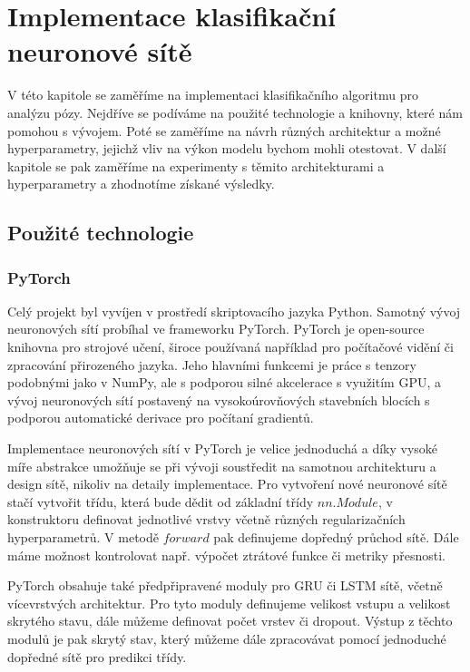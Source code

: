 \chapter{Implementace klasifikační neuronové sítě}
\label{chap:ClassificationImplementation}

V této kapitole se zaměříme na implementaci klasifikačního algoritmu pro
analýzu pózy. Nejdříve se podíváme na použité technologie a knihovny, které nám
pomohou s vývojem. Poté se zaměříme na návrh různých architektur a možné
hyperparametry, jejichž vliv na výkon modelu bychom mohli otestovat. V další
kapitole se pak zaměříme na experimenty s těmito architekturami a
hyperparametry a zhodnotíme získané výsledky.

\section{Použité technologie}

\subsection{PyTorch}

Celý projekt byl vyvíjen v prostředí skriptovacího jazyka Python. Samotný vývoj
neuronových sítí probíhal ve frameworku PyTorch. PyTorch je open-source
knihovna pro strojové učení, široce používaná například pro počítačové vidění
či zpracování přirozeného jazyka. Jeho hlavními funkcemi je práce s tenzory
podobnými jako v NumPy, ale s podporou silné akcelerace s využitím GPU, a vývoj
neuronových sítí postavený na vysokoúrovňových stavebních blocích s podporou
automatické derivace pro počítaní gradientů.

Implementace neuronových sítí v PyTorch je velice jednoduchá a díky vysoké míře
abstrakce umožňuje se při vývoji soustředit na samotnou architekturu a design
sítě, nikoliv na detaily implementace. Pro vytvoření nové neuronové sítě stačí
vytvořit třídu, která bude dědit od základní třídy $nn.Module$, v konstruktoru
definovat jednotlivé vrstvy včetně různých regularizačních hyperparametrů. V
metodě $forward$ pak definujeme dopředný průchod sítě. Dále máme možnost
kontrolovat např. výpočet ztrátové funkce či metriky přesnosti.

PyTorch obsahuje také předpřipravené moduly pro GRU či LSTM sítě, včetně
vícevrstvých architektur. Pro tyto moduly definujeme velikost vstupu a velikost
skrytého stavu, dále můžeme definovat počet vrstev či dropout. Výstup z těchto
modulů je pak skrytý stav, který můžeme dále zpracovávat pomocí jednoduché
dopředné sítě pro predikci třídy.

